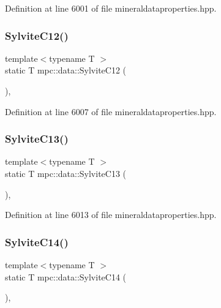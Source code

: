 Definition at line 6001 of file mineraldataproperties.\+hpp.

\mbox{\label{namespacempc_1_1data_a9bf1775beb22532a96bd054751f2e561}} 
\subsubsection{\texorpdfstring{Sylvite\+C12()}{SylviteC12()}}
{\footnotesize\ttfamily template$<$typename T $>$ \\
static T mpc\+::data\+::\+Sylvite\+C12 (\begin{DoxyParamCaption}{ }\end{DoxyParamCaption})\hspace{0.3cm}{\ttfamily [inline]}, {\ttfamily [static]}}



Definition at line 6007 of file mineraldataproperties.\+hpp.

\mbox{\label{namespacempc_1_1data_a08c4e82a11e585d47d341aa5ddd3dddd}} 
\subsubsection{\texorpdfstring{Sylvite\+C13()}{SylviteC13()}}
{\footnotesize\ttfamily template$<$typename T $>$ \\
static T mpc\+::data\+::\+Sylvite\+C13 (\begin{DoxyParamCaption}{ }\end{DoxyParamCaption})\hspace{0.3cm}{\ttfamily [inline]}, {\ttfamily [static]}}



Definition at line 6013 of file mineraldataproperties.\+hpp.

\mbox{\label{namespacempc_1_1data_a2dc88352856e604c3b57eaba96f39365}} 
\subsubsection{\texorpdfstring{Sylvite\+C14()}{SylviteC14()}}
{\footnotesize\ttfamily template$<$typename T $>$ \\
static T mpc\+::data\+::\+Sylvite\+C14 (\begin{DoxyParamCaption}{ }\end{DoxyParamCaption})\hspace{0.3cm}{\ttfamily [inline]}, {\ttfamily [static]}}



